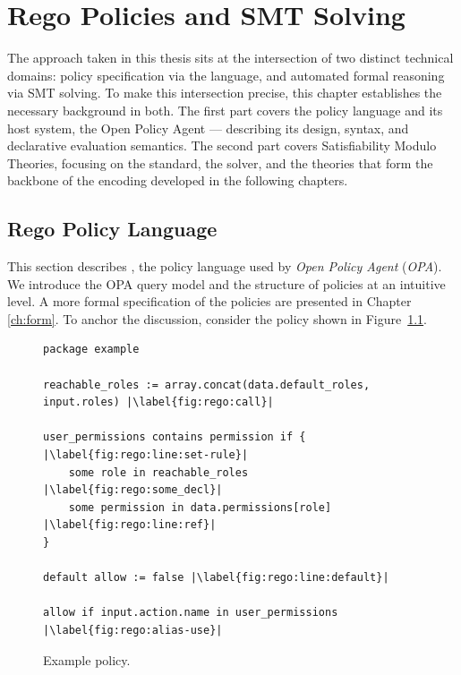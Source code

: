 \chapter{Rego Policies and SMT Solving}
\label{ch:theory}

The approach taken in this thesis sits at the intersection of two distinct technical domains: policy specification via the \rego language, and automated formal reasoning via SMT solving.
To make this intersection precise, this chapter establishes the necessary background in both.
The first part covers the \rego policy language and its host system, the Open Policy Agent — describing its design, syntax, and declarative evaluation semantics.
The second part covers Satisfiability Modulo Theories, focusing on the \smtlib standard, the \ziii solver, and the theories that form the backbone of the encoding developed in the following chapters.

\section{Rego Policy Language}
\label{sec:rego}

This section describes \rego, the policy language used by \emph{Open Policy Agent} (\emph{OPA}).
We introduce the OPA query model and the structure of \rego policies at an intuitive level.
A more formal specification of the policies are presented in Chapter \ref{ch:form}.
To anchor the discussion, consider the policy shown in Figure~\ref{fig:rego}.

\begin{figure}
  \label{fig:rego}
  \begin{lstlisting}[language=Rego,escapechar=|]
package example

reachable_roles := array.concat(data.default_roles, input.roles) |\label{fig:rego:call}|

user_permissions contains permission if { |\label{fig:rego:line:set-rule}|
    some role in reachable_roles |\label{fig:rego:some_decl}|
    some permission in data.permissions[role] |\label{fig:rego:line:ref}|
}

default allow := false |\label{fig:rego:line:default}|

allow if input.action.name in user_permissions |\label{fig:rego:alias-use}|
\end{lstlisting}
  \caption{Example \rego policy.}
\end{figure}

